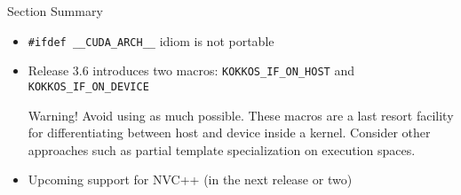 \begin{frame}{Section Summary}

  \begin{itemize}
    \item{{\color{blue}\texttt{\#ifdef \_\_CUDA\_ARCH\_\_}} idiom is not portable}
    \item{Release 3.6 introduces two macros: {\color{blue}\texttt{KOKKOS\_IF\_ON\_HOST}} and {\color{blue}\texttt{KOKKOS\_IF\_ON\_DEVICE}}}
    \begin{alertblock}{Warning!}
       Avoid using as much possible.  These macros are a last resort facility for differentiating between host and device inside a kernel.
       Consider other approaches such as partial template specialization on execution spaces.
    \end{alertblock}
    \item{Upcoming support for NVC++ (in the next release or two)}
  \end{itemize}

\end{frame}
